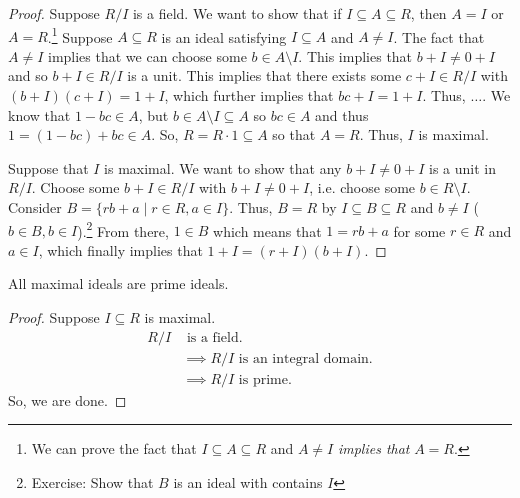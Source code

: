 \documentclass[letterpaper]{article}
\begin{document}
\begin{mdframed}[]
    \begin{proof}
        Suppose $R / I$ is a field. We want to show that if $I \subseteq A \subseteq R$, then $A = I$ or $A = R$.\footnote{We can prove the fact that $I \subseteq A \subseteq R$ and $A \neq I$ \emph{implies that} $A = R$.} Suppose $A \subseteq R$ is an ideal satisfying $I \subseteq A$ and $A \neq I$. The fact that $A \neq I$ implies that we can choose some $b \in A \setminus I$. This implies that $b + I \neq 0 + I$ and so $b + I \in R / I$ is a unit. This implies that there exists some $c + I \in R / I$ with $(b + I)(c + I) = 1 + I$, which further implies that $bc + I = 1 + I$. Thus, $\dots$. We know that $1 - bc \in A$, but $b \in A \setminus I \subseteq A$ so $bc \in A$ and thus $1 = (1 - bc) + bc \in A$. So, $R = R \cdot 1 \subseteq A$ so that $A = R$. Thus, $I$ is maximal. 

        \bigskip 

        Suppose that $I$ is maximal. We want to show that any $b + I \neq 0 + I$ is a unit in $R / I$. Choose some $b + I \in R / I$ with $b + I \neq 0 + I$, i.e. choose some $b \in R \setminus I$. Consider $B = \{rb + a \mid r \in R, a \in I\}$. Thus, $B = R$ by $I \subseteq B \subseteq R$ and $b \neq I$ ($b \in B, b \in I$).\footnote{Exercise: Show that $B$ is an ideal with contains $I$} From there, $1 \in B$ which means that $1 = rb + a$ for some $r \in R$ and $a \in I$, which finally implies that $1 + I = (r + I)(b + I)$.
    \end{proof}
\end{mdframed}

\begin{corollary}{}{}
    All maximal ideals are prime ideals.
\end{corollary}

\begin{mdframed}[]
    \begin{proof}
        Suppose $I \subseteq R$ is maximal.
        \begin{equation*}
            \begin{aligned}
                R / I& \text{ is a field.} \\ 
                    &\implies R / I \text{ is an integral domain.} \\ 
                    &\implies R / I \text{ is prime.}
            \end{aligned}
        \end{equation*}
        So, we are done.
    \end{proof}
\end{mdframed}
\end{document}
